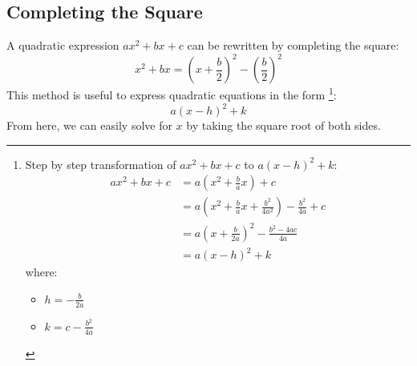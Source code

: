 
\subsection{Completing the Square}
A quadratic expression $ax^2 + bx + c$ can be rewritten by completing the square:
\begin{equation}
    x^2 + bx = \left(x + \frac{b}{2}\right)^2 - \left(\frac{b}{2}\right)^2
\end{equation}
This method is useful to express quadratic equations in the form \footnote{Step by step transformation of $ax^2 + bx + c$ to
$a(x - h)^2 + k$:
\begin{equation*}
    \begin{aligned}
        ax^2 + bx + c &= a\left(x^2 + \frac{b}{a}x\right) + c \\
        &= a\left(x^2 + \frac{b}{a}x + \frac{b^2}{4a^2}\right) - \frac{b^2}{4a} + c \\
        &= a\left(x + \frac{b}{2a}\right)^2 - \frac{b^2 - 4ac}{4a} \\
        &= a(x - h)^2 + k
    \end{aligned}
\end{equation*}
where:
\begin{itemize}
    \item $h = -\frac{b}{2a}$
    \item $k = c - \frac{b^2}{4a}$
\end{itemize}}:
\begin{equation}
    a(x - h)^2 + k
\end{equation}
From here, we can easily solve for $x$ by taking the square root of both sides.